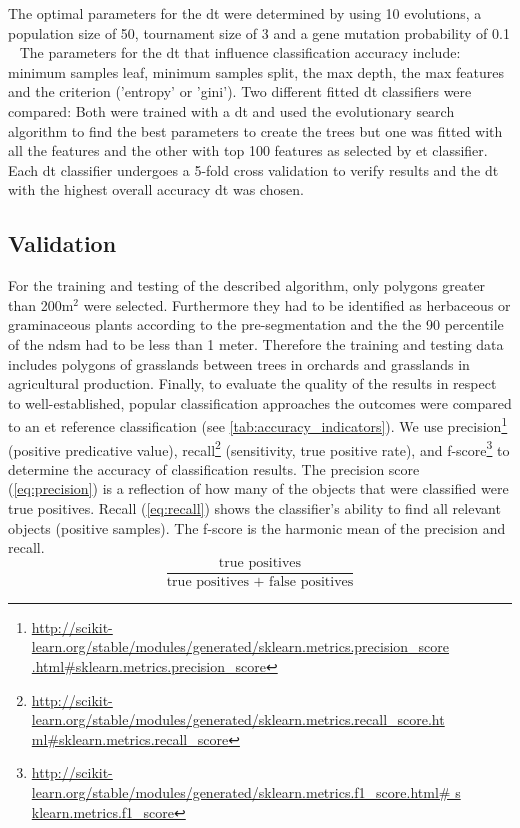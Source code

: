 \documentclass[authoryear,review,12pt,number]{elsarticle}
\begin{document}
The optimal parameters for the \gls{dt} were determined by using 10 evolutions, 
a population size of 50, tournament size of 3 and a gene mutation probability 
of 0.1 ~\citep{DEAP_JMLR2012} The parameters for the \gls{dt} that influence 
classification accuracy include: minimum samples leaf, minimum samples split, 
the max depth, the max features and the criterion ('entropy' or 'gini'). Two 
different fitted \gls{dt} classifiers were compared: Both were trained with a 
\gls{dt} and used the evolutionary search algorithm to find the best parameters 
to create the trees but one was fitted with all the features and the other with 
top 100 features as selected by \gls{et} classifier. Each \gls{dt} classifier 
undergoes a 5-fold cross validation to verify results and the \gls{dt} with the 
highest overall accuracy \gls{dt} was chosen.
\label{subsec:rulegen_data_mining}

\subsection{Validation} 
\label{subsec:Validation}
For the training and testing of the described algorithm, only polygons greater
than 200m$^{2}$ were selected. Furthermore they had to be identified as
herbaceous or graminaceous plants according to the pre-segmentation and the 
the 90 percentile of the \gls{ndsm} had to be less than 1 meter. Therefore the
training and testing data includes polygons of grasslands between trees in
orchards and grasslands in agricultural production. Finally, to evaluate the
quality of the results in respect to well-established, popular classification
approaches the outcomes were compared to an \gls{et} reference classification
(see \ref{tab:accuracy_indicators}).
We use precision\footnote{\url{
http://scikit-learn.org/stable/modules/generated/sklearn.metrics.precision_score
.html\#sklearn.metrics.precision\_score}} (positive predicative value), 
recall\footnote{\url{
http://scikit-learn.org/stable/modules/generated/sklearn.metrics.recall_score.ht
ml\#sklearn.metrics.recall\_score}} (sensitivity, true positive rate), 
and 
f-score\footnote{\url{
http://scikit-learn.org/stable/modules/generated/sklearn.metrics.f1_score.html\#
s
klearn.metrics.f1\_score}} to determine the accuracy of classification results. 
The precision score (\ref{eq:precision}) is a reflection of how many of the 
objects that were classified were true positives. Recall (\ref{eq:recall}) 
shows 
the classifier's ability to find all relevant objects (positive samples). The 
f-score is the harmonic mean of the precision and recall.
\begin{equation}\label{eq:precision}
    \frac{\text{true positives}}{\text{true positives + false positives}}
\end{equation}
\end{document}
